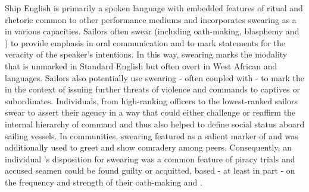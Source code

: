 Ship English is primarily a spoken language with embedded features of ritual and rhetoric common to other performance mediums and incorporates swearing as a  in various capacities. Sailors often swear (including oath-making, blasphemy and ) to provide emphasis in oral communication and to mark statements for the veracity of the speaker’s intentions. In this way, swearing marks the  modality that is unmarked in Standard English but often overt in West African and  languages. Sailors also potentially use swearing - often coupled with  - to mark the  in the context of issuing further threats of violence and commands to captives or subordinates. Individuals, from {high-ranking officers to the lowest-ranked sailors} swear to assert their agency in a way that could either challenge or reaffirm the internal hierarchy of command and thus also helped to define social status aboard sailing vessels. In  communities, swearing featured as a salient marker of  and was additionally used to greet and show comradery among peers.  Consequently, an individual ’s disposition for swearing was a common feature of piracy trials and accused seamen could be found guilty or acquitted, based - at least in part - on the frequency and strength of their oath-making and . 


